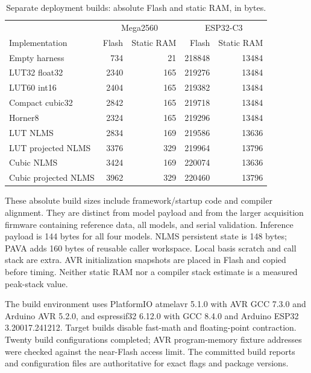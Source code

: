 \documentclass[10pt,letterpaper]{article}
\begin{document}
\begin{table}[!ht]
\centering\caption{Separate deployment builds: absolute Flash and static RAM, in bytes.}
\small\begin{tabular}{lrrrr}\toprule
&\multicolumn{2}{c}{Mega2560}&\multicolumn{2}{c}{ESP32-C3}\\
Implementation & Flash & Static RAM & Flash & Static RAM\\\midrule
Empty harness&734&21&218848&13484\\
LUT32 float32&2340&165&219276&13484\\
LUT60 int16&2404&165&219382&13484\\
Compact cubic32&2842&165&219718&13484\\
Horner8&2324&165&219296&13484\\
LUT NLMS&2834&169&219586&13636\\
LUT projected NLMS&3376&329&219964&13796\\
Cubic NLMS&3424&169&220074&13636\\
Cubic projected NLMS&3962&329&220460&13796\\\bottomrule
\end{tabular}
\end{table}

These absolute build sizes include framework/startup code and compiler alignment. They are distinct from model payload and from the larger acquisition firmware containing reference data, all models, and serial validation. Inference payload is 144 bytes for all four models. NLMS persistent state is 148 bytes; PAVA adds 160 bytes of reusable caller workspace. Local basis scratch and call stack are extra. AVR initialization snapshots are placed in Flash and copied before timing. Neither static RAM nor a compiler stack estimate is a measured peak-stack value.

The build environment uses PlatformIO atmelavr 5.1.0 with AVR GCC 7.3.0 and Arduino AVR 5.2.0, and espressif32 6.12.0 with GCC 8.4.0 and Arduino ESP32 3.20017.241212. Target builds disable fast-math and floating-point contraction. Twenty build configurations completed; AVR program-memory fixture addresses were checked against the near-Flash access limit. The committed build reports and configuration files are authoritative for exact flags and package versions.

\clearpage
\end{document}

